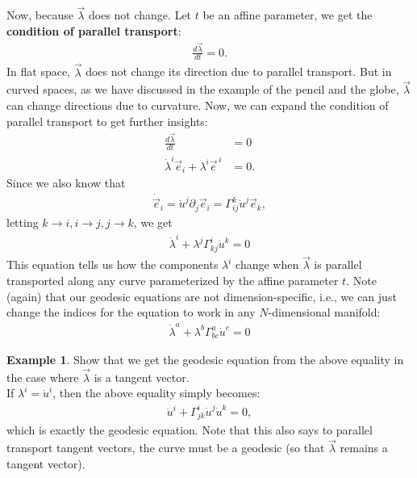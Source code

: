 \documentclass{article}
\theoremstyle{definition}
\newtheorem{exmp}{Example}[section]
\begin{document}
Now, because $\vec{\lambda}$ does not change. Let $t$ be an affine parameter, we get the \textbf{condition of parallel transport}:
\begin{align*}
\frac{d\vec{\lambda}}{dt} = 0.
\end{align*}  
In flat space, $\vec{\lambda}$ does not change its direction due to parallel transport. But in curved spaces, as we have discussed in the example of the pencil and the globe, $\vec{\lambda}$ can change directions due to curvature. Now, we can expand the condition of parallel transport to get further insights:
\begin{align*}
\frac{d\vec{\lambda}}{dt} &= 0\\
\dot{\lambda}^i \vec{e}_i + \lambda^i\vec{e}^{\,i} &= 0.
\end{align*}
Since we also know that
\begin{align*}
\dot{\vec{e}}_i = \dot{u}^j\partial_j\vec{e}_i = \Gamma^k_{ij}\dot{u}^j\vec{e}_k,
\end{align*}
letting $k\rightarrow i, i \rightarrow j, j \rightarrow k$, we get
\begin{align*}
\dot{\lambda}^i + \lambda^j \Gamma^i_{kj}\dot{u}^k = 0
\end{align*}
This equation tells us how the components $\lambda^i$ change when $\vec{\lambda}$ is parallel transported along any curve parameterized by the affine parameter $t$. Note (again) that our geodesic equations are not dimension-specific, i.e., we can just change the indices for the equation to work in any $N$-dimensional manifold:
\begin{align*}
\boxed{\dot{\lambda}^a + \lambda^b \Gamma^a_{bc}\dot{u}^c = 0}
\end{align*}

\begin{exmp}
	Show that we get the geodesic equation from the above equality in the case where $\vec{\lambda}$ is a tangent vector.\\
	
	If $\lambda^i = \dot{u}^i$, then the above equality simply becomes:
	\begin{align*}
	\ddot{u}^i + \Gamma^i_{jk}\dot{u}^j\dot{u}^k = 0,
	\end{align*}
	which is exactly the geodesic equation. Note that this also says to parallel transport tangent vectors, the curve must be a geodesic (so that $\vec{\lambda}$ remains a tangent vector). 
\end{exmp}
\end{document}
